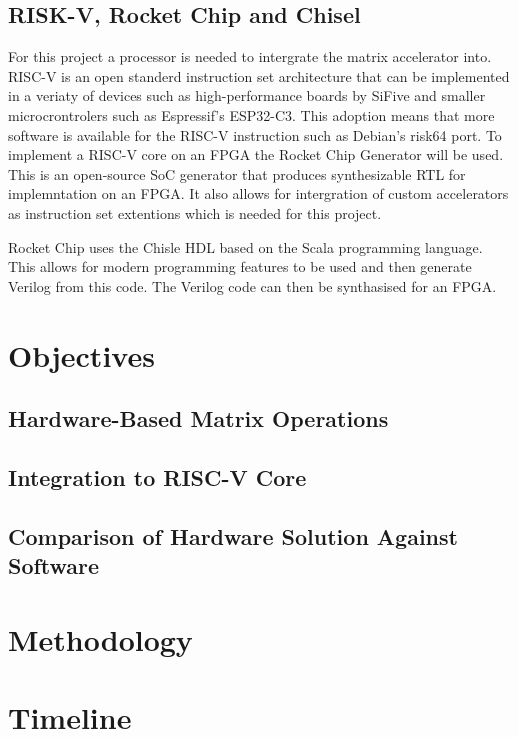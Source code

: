 \documentclass[a4paper,fleqn,12pt]{article}
\begin{document}
	\subsection{RISK-V, Rocket Chip and Chisel}
	For this project a processor is needed to intergrate the matrix accelerator into. RISC-V is an open standerd instruction set architecture that can be implemented in a veriaty of devices such as high-performance boards by SiFive and smaller microcrontrolers such as Espressif's ESP32-C3. This adoption means that more software is available for the RISC-V instruction such as Debian's risk64 port. To implement a RISC-V core on an FPGA the Rocket Chip Generator will be used. This is an open-source SoC generator that produces synthesizable RTL for implemntation on an FPGA. It also allows for intergration of custom accelerators as instruction set extentions \citep{rocketchip} which is needed for this project.
	
	Rocket Chip uses the Chisle HDL based on the Scala programming language. This allows for modern programming features to be used and then generate Verilog from this code. The Verilog code can then be synthasised for an FPGA.
	
	\section{Objectives}
	\subsection{Hardware-Based Matrix Operations}
	\subsection{Integration to RISC-V Core}
	\subsection{Comparison of Hardware Solution Against Software}
	
	\section{Methodology}
	
	\section{Timeline}
	
\end{document}
